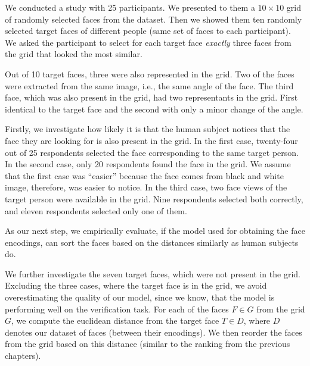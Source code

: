 We conducted a study with 25 participants. We presented to them a $10\times10$ grid of randomly selected faces from the dataset. 
Then we showed them ten randomly selected target faces of different people (same set of faces to each participant). We asked the participant to select for each target face \emph{exactly} three faces from the grid that looked the most similar. 


Out of 10 target faces, three were also represented in the grid. Two of the faces were extracted from the same image, i.e., the same angle of the face. The third face, which was also present in the grid, had two representants in the grid. First identical to the target face and the second with only a minor change of the angle.

Firstly, we investigate how likely it is that the human subject notices that the face they are looking for is also present in the grid. In the first case, twenty-four out of 25 respondents selected the face corresponding to the same target person. In the second case, only 20 respondents found the face in the grid. We assume that the first case was ``easier'' because the face comes from black and white image, therefore, was easier to notice. In the third case, two face views of the target person were available in the grid. Nine respondents selected both correctly, and eleven respondents selected only one of them. 

As our next step, we empirically evaluate, if the model used for obtaining the face encodings, can sort the faces based on the distances similarly as human subjects do.

We further investigate the seven target faces, which were not present in the grid. Excluding the three cases, where the target face is in the grid, we avoid overestimating the quality of our model, since we know, that the model is performing well on the verification task. For each of the faces $F\in G$ from the grid $G$, we compute the euclidean distance from the target face $T\in D$, where $D$ denotes our dataset of faces (between their encodings). We then reorder the faces from the grid based on this distance (similar to the ranking from the previous chapters). 

